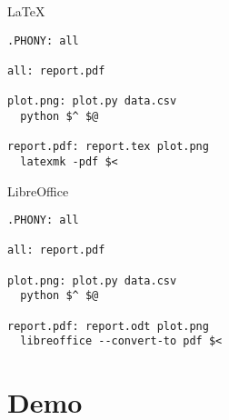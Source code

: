 \documentclass{beamer}
\begin{document}
\begin{frame}[fragile]{\LaTeX}
  \begin{lstlisting}
.PHONY: all

all: report.pdf

plot.png: plot.py data.csv
  python $^ $@

report.pdf: report.tex plot.png
  latexmk -pdf $<
  \end{lstlisting}
\end{frame}

\begin{frame}[fragile]{LibreOffice}
  \begin{lstlisting}
.PHONY: all

all: report.pdf

plot.png: plot.py data.csv
  python $^ $@

report.pdf: report.odt plot.png
  libreoffice --convert-to pdf $<
  \end{lstlisting}
\end{frame}

\section{Demo}

\begin{frame}
  \begin{center}
  \end{center}
\end{frame}
\end{document}
